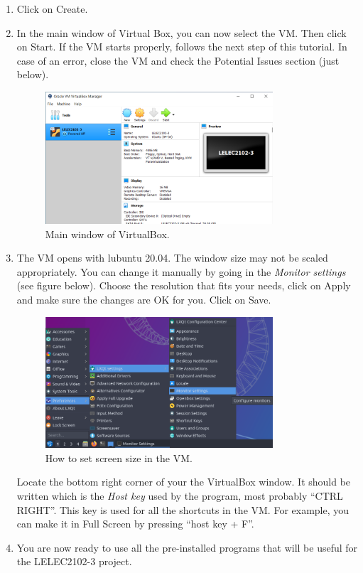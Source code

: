 \documentclass[a4paper,11pt]{article}
\begin{document}
\begin{enumerate}
\item Click on Create.
\item In the main window of Virtual Box, you can now select the VM. Then click on Start. If the VM starts properly, follows the next step of this tutorial. In case of an error, close the VM and check the Potential Issues section (just below).

\begin{figure}[H]
    \centering
    \includegraphics[width=0.8\textwidth]{figs/Capture3.PNG}
	\caption{Main window of VirtualBox.}
	\label{fig2}
\end{figure}

\item The VM opens with lubuntu 20.04. The window size may not be scaled appropriately. You can change it manually by going in the \textit{Monitor settings} (see figure below). Choose the resolution that fits your needs, click on Apply and make sure the changes are OK for you. Click on Save.
\begin{figure}[H]
    \centering
    \includegraphics[width=0.8\textwidth]{figs/screen_size.png}
	\caption{How to set screen size in the VM.}
	\label{fig3}
\end{figure}
Locate the bottom right corner of your the VirtualBox window. It should be written which is the \textit{Host key} used by the program, most probably ``CTRL RIGHT''. This key is used for all the shortcuts in the VM. For example, you can make it in Full Screen by pressing ``host key + F''.

\item You are now ready to use all the pre-installed programs that will be useful for the LELEC2102-3 project.
\end{enumerate}
\end{document}
